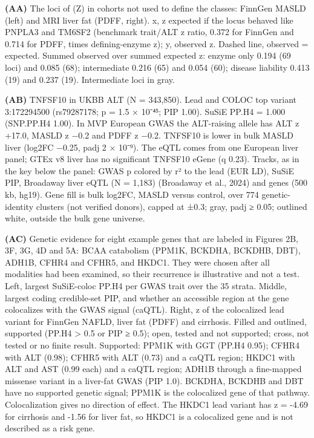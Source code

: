 \textbf{(AA)} The loci of (Z) in cohorts not used to define the classes: FinnGen MASLD (left) and MRI liver fat (PDFF, right). x, z expected if the locus behaved like PNPLA3 and TM6SF2 (benchmark trait/ALT z ratio, 0.372 for FinnGen and 0.714 for PDFF, times defining-enzyme z); y, observed z. Dashed line, observed = expected. Summed observed over summed expected z: enzyme only 0.194 (69 loci) and 0.085 (68); intermediate 0.216 (65) and 0.054 (60); disease liability 0.413 (19) and 0.237 (19). Intermediate loci in gray.

\textbf{(AB)} TNFSF10 in UKBB ALT (N = 343,850). Lead and COLOC top variant 3:172294500 (rs79287178; p = 1.5 × 10⁻⁴⁵; PIP 1.00). SuSiE PP.H4 = 1.000 (SNP.PP.H4 1.00). In MVP European GWAS the ALT-raising allele has ALT z +17.0, MASLD z −0.2 and PDFF z −0.2. TNFSF10 is lower in bulk MASLD liver (log2FC −0.25, padj 2 × 10⁻⁹). The eQTL comes from one European liver panel; GTEx v8 liver has no significant TNFSF10 eGene (q 0.23). Tracks, as in the key below the panel: GWAS p colored by r² to the lead (EUR LD), SuSiE PIP, Broadaway liver eQTL (N = 1,183) (Broadaway et al., 2024) and genes (500 kb, hg19). Gene fill is bulk log2FC, MASLD versus control, over 774 genetic-identity clusters (not verified donors), capped at ±0.3; gray, padj ≥ 0.05; outlined white, outside the bulk gene universe.

\textbf{(AC)} Genetic evidence for eight example genes that are labeled in Figures 2B, 3F, 3G, 4D and 5A: BCAA catabolism (PPM1K, BCKDHA, BCKDHB, DBT), ADH1B, CFHR4 and CFHR5, and HKDC1. They were chosen after all modalities had been examined, so their recurrence is illustrative and not a test. Left, largest SuSiE-coloc PP.H4 per GWAS trait over the 35 strata. Middle, largest coding credible-set PIP, and whether an accessible region at the gene colocalizes with the GWAS signal (caQTL). Right, z of the colocalized lead variant for FinnGen NAFLD, liver fat (PDFF) and cirrhosis. Filled and outlined, supported (PP.H4 \textgreater{} 0.5 or PIP ≥ 0.5); open, tested and not supported; cross, not tested or no finite result. Supported: PPM1K with GGT (PP.H4 0.95); CFHR4 with ALT (0.98); CFHR5 with ALT (0.73) and a caQTL region; HKDC1 with ALT and AST (0.99 each) and a caQTL region; ADH1B through a fine-mapped missense variant in a liver-fat GWAS (PIP 1.0). BCKDHA, BCKDHB and DBT have no supported genetic signal; PPM1K is the colocalized gene of that pathway. Colocalization gives no direction of effect. The HKDC1 lead variant has z = -4.69 for cirrhosis and -1.56 for liver fat, so HKDC1 is a colocalized gene and is not described as a risk gene.

